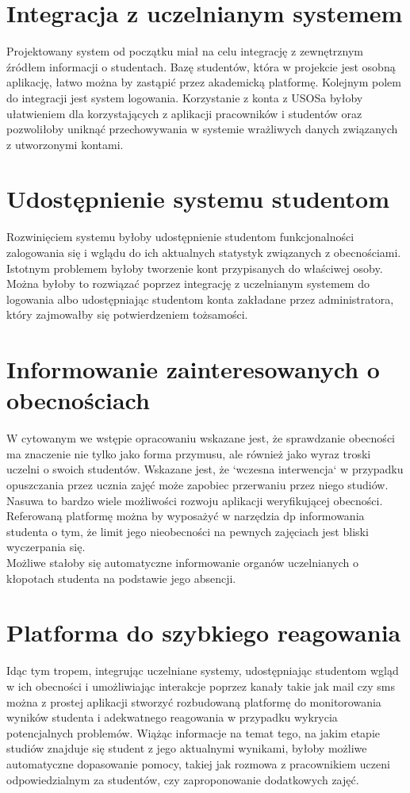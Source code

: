\documentclass[declaration,shortabstract, mgr]{iithesis}
\begin{document}
\section{Integracja z uczelnianym systemem}
\indent Projektowany system od początku miał na celu integrację z zewnętrznym źródłem informacji o studentach. Bazę studentów, która w projekcie jest osobną aplikację, łatwo można by zastąpić przez akademicką platformę. Kolejnym polem do integracji jest system logowania. Korzystanie z konta z USOSa byłoby ułatwieniem dla korzystających z aplikacji pracowników i studentów oraz pozwoliłoby uniknąć przechowywania w systemie wrażliwych danych związanych z utworzonymi kontami.
\section{Udostępnienie systemu studentom}
\indent Rozwinięciem systemu byłoby udostępnienie studentom funkcjonalności zalogowania się i wglądu do ich aktualnych statystyk związanych z obecnościami. Istotnym problemem byłoby tworzenie kont przypisanych do właściwej osoby. Można byłoby to rozwiązać poprzez integrację z uczelnianym systemem do logowania albo udostępniając studentom konta zakładane przez administratora, który zajmowałby się potwierdzeniem tożsamości.
\section{Informowanie zainteresowanych o obecnościach}
\indent W cytowanym we wstępie opracowaniu\cite{theory_base} wskazane jest, że sprawdzanie obecności ma znaczenie nie tylko jako forma przymusu, ale również jako wyraz troski uczelni o swoich studentów. Wskazane jest, że `wczesna interwencja` w przypadku opuszczania przez ucznia zajęć może zapobiec przerwaniu przez niego studiów. Nasuwa to bardzo wiele możliwości rozwoju aplikacji weryfikującej obecności. Referowaną platformę można by wyposażyć w narzędzia dp  informowania studenta o tym, że limit jego nieobecności na pewnych zajęciach jest bliski wyczerpania się. \\
\indent Możliwe stałoby się automatyczne informowanie organów uczelnianych o kłopotach studenta na podstawie jego absencji. \\
\section{Platforma do szybkiego reagowania}
\indent Idąc tym tropem, integrując uczelniane systemy, udostępniając studentom wgląd w ich obecności i umożliwiając interakcje poprzez kanały takie jak mail czy sms można z prostej aplikacji stworzyć rozbudowaną platformę do monitorowania wyników studenta i adekwatnego reagowania w przypadku wykrycia potencjalnych problemów. Wiążąc informacje na temat tego, na jakim etapie studiów znajduje się student z jego aktualnymi wynikami, byłoby możliwe automatyczne dopasowanie pomocy, takiej jak rozmowa z pracownikiem uczeni odpowiedzialnym za studentów, czy zaproponowanie dodatkowych zajęć.
\end{document}
